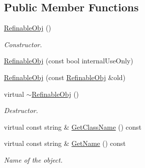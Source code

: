 \subsection*{Public Member Functions}
\begin{DoxyCompactItemize}
\item 
\mbox{\label{class_obj_cryst_1_1_refinable_obj_a081d2bfc2065c2adaa2bfdf292900235}} 
\mbox{\hyperlink{class_obj_cryst_1_1_refinable_obj_a081d2bfc2065c2adaa2bfdf292900235}{Refinable\+Obj}} ()
\begin{DoxyCompactList}\small\item\em Constructor. \end{DoxyCompactList}\item 
\mbox{\hyperlink{class_obj_cryst_1_1_refinable_obj_aa0eaf0982686476cbec02a8afeebc92d}{Refinable\+Obj}} (const bool internal\+Use\+Only)
\item 
\mbox{\hyperlink{class_obj_cryst_1_1_refinable_obj_a5f77dcf037cc8d2ea1fd84bfda6ddbc0}{Refinable\+Obj}} (const \mbox{\hyperlink{class_obj_cryst_1_1_refinable_obj}{Refinable\+Obj}} \&old)
\item 
\mbox{\label{class_obj_cryst_1_1_refinable_obj_a06e668dddc77f0ecc3402e78e54221cb}} 
virtual \mbox{\hyperlink{class_obj_cryst_1_1_refinable_obj_a06e668dddc77f0ecc3402e78e54221cb}{$\sim$\+Refinable\+Obj}} ()
\begin{DoxyCompactList}\small\item\em Destructor. \end{DoxyCompactList}\item 
virtual const string \& \mbox{\hyperlink{class_obj_cryst_1_1_refinable_obj_a0803a4bd89142dc93c79ed3329bb6e1d}{Get\+Class\+Name}} () const
\item 
\mbox{\label{class_obj_cryst_1_1_refinable_obj_a2d881bf3abcb527cf96142e51226e449}} 
virtual const string \& \mbox{\hyperlink{class_obj_cryst_1_1_refinable_obj_a2d881bf3abcb527cf96142e51226e449}{Get\+Name}} () const
\begin{DoxyCompactList}\small\item\em Name of the object. \end{DoxyCompactList}\item 
\mbox{\label{class_obj_cryst_1_1_refinable_obj_a18aa908aff25a8eb86124ea5164c4f1c}} 

\end{DoxyCompactItemize}
